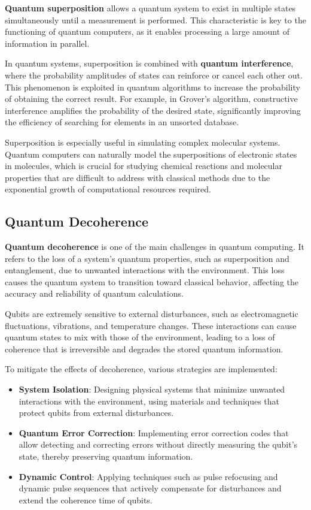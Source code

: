 \textbf{Quantum superposition} allows a quantum system to exist in multiple states simultaneously until a measurement is performed. This characteristic is key to the functioning of quantum computers, as it enables processing a large amount of information in parallel.

In quantum systems, superposition is combined with \textbf{quantum interference}, where the probability amplitudes of states can reinforce or cancel each other out. This phenomenon is exploited in quantum algorithms to increase the probability of obtaining the correct result. For example, in Grover's algorithm, constructive interference amplifies the probability of the desired state, significantly improving the efficiency of searching for elements in an unsorted database.

Superposition is especially useful in simulating complex molecular systems. Quantum computers can naturally model the superpositions of electronic states in molecules, which is crucial for studying chemical reactions and molecular properties that are difficult to address with classical methods due to the exponential growth of computational resources required.

\subsection{Quantum Decoherence}

\textbf{Quantum decoherence} is one of the main challenges in quantum computing. It refers to the loss of a system's quantum properties, such as superposition and entanglement, due to unwanted interactions with the environment. This loss causes the quantum system to transition toward classical behavior, affecting the accuracy and reliability of quantum calculations.

Qubits are extremely sensitive to external disturbances, such as electromagnetic fluctuations, vibrations, and temperature changes. These interactions can cause quantum states to mix with those of the environment, leading to a loss of coherence that is irreversible and degrades the stored quantum information.

To mitigate the effects of decoherence, various strategies are implemented:

\begin{itemize}
    \item \textbf{System Isolation}: Designing physical systems that minimize unwanted interactions with the environment, using materials and techniques that protect qubits from external disturbances.
    \item \textbf{Quantum Error Correction}: Implementing error correction codes that allow detecting and correcting errors without directly measuring the qubit's state, thereby preserving quantum information.
    \item \textbf{Dynamic Control}: Applying techniques such as pulse refocusing and dynamic pulse sequences that actively compensate for disturbances and extend the coherence time of qubits.
\end{itemize}


